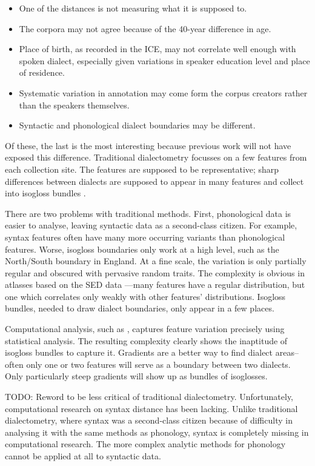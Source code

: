 \documentclass[11pt]{article}
\begin{document}
\begin{itemize}
\item One of the distances is not measuring what it is supposed to.
\item The corpora may not agree because of the 40-year difference in age.
\item Place of birth, as recorded in the ICE, may not correlate well
  enough with spoken dialect, especially given variations in speaker
  education level and place of residence.
\item Systematic variation in annotation may come form the corpus
  creators rather than the speakers themselves.
\item Syntactic and phonological dialect boundaries may be different.
\end{itemize}

Of these, the last is the most interesting because previous work
will not have exposed this difference. Traditional dialectometry
focusses on a few features from each collection site. The features
are supposed to be representative; sharp differences between dialects
are supposed to appear in many features and collect into isogloss
bundles \cite{chambers92}.

There are two problems with traditional methods. First, phonological
data is easier to analyse, leaving syntactic data as a second-class
citizen. For example, syntax features often have many more occurring
variants than phonological features. Worse, isogloss boundaries only
work at a high level, such as the North/South boundary in England. At
a fine scale, the variation is only partially regular and obscured
with pervasive random traits. The complexity is obvious in atlasses
based on the SED data \cite{orton78}---many features have a regular
distribution, but one which correlates only weakly with other
features' distributions. Isogloss bundles, needed to draw dialect
boundaries, only appear in a few places.

Computational analysis, such as
\cite{shackleton07}, captures feature variation precisely using
statistical analysis. The resulting complexity clearly shows the
inaptitude of isogloss bundles to capture it. Gradients are a better
way to find dialect areas--often only one or two features will serve
as a boundary between two dialects. Only particularly steep gradients will show
up as bundles of isoglosses.

TODO: Reword to be less critical of traditional dialectometry.
Unfortunately, computational research on syntax distance has been
lacking. Unlike traditional dialectometry, where syntax was a second-class
citizen because of difficulty in analysing it with the same methods as
phonology, syntax is completely missing in computational
research. The more complex analytic methods for phonology cannot be applied at all
to syntactic data.
\end{document}
